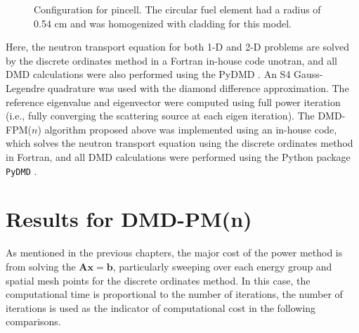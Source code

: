 \begin{figure}[htb]
    \centering
    \caption{Configuration for pincell.  The circular fuel element had a 
             radius of 0.54 cm and was homogenized with cladding for this 
             model.}
    \label{fig:pin_cell_config}
\end{figure}
Here, the neutron transport equation for both 1-D and 2-D problems are solved by the discrete ordinates method in a Fortran in-house code unotran, and all DMD calculations were also performed using the PyDMD \cite{pydmd}.
An S4 Gauss-Legendre quadrature was used with the diamond difference approximation.
The reference eigenvalue and eigenvector were computed using full power iteration (i.e., fully converging the scattering source at each eigen iteration).
The DMD-FPM($n$) algorithm proposed above was implemented using an in-house code, which solves the neutron transport equation using the discrete ordinates method in Fortran, and all DMD calculations were performed using the Python package {\tt PyDMD} \cite{pydmd}.


\section{Results for DMD-PM(n)}
As mentioned in the previous chapters, the major cost of the power method is from solving the $\mathbf{Ax =b}$, particularly sweeping over each energy group and spatial mesh points for the discrete ordinates method.
In this case, the computational time is proportional to the number of iterations, the number of iterations is used as the indicator of computational cost in the following comparisons.

